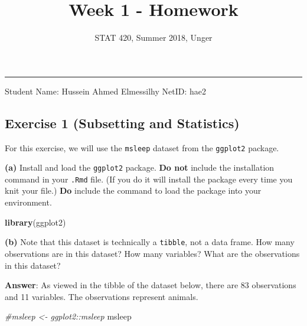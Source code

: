 \documentclass[]{article}
\title{Week 1 - Homework}
\author{STAT 420, Summer 2018, Unger}
\date{}
\newenvironment{Shaded}{\begin{snugshade}}{\end{snugshade}}
\newcommand{\KeywordTok}[1]{\textcolor[rgb]{0.13,0.29,0.53}{\textbf{#1}}}
\newcommand{\CommentTok}[1]{\textcolor[rgb]{0.56,0.35,0.01}{\textit{#1}}}
\newcommand{\NormalTok}[1]{#1}
\begin{document}
\maketitle

\begin{center}\rule{0.5\linewidth}{\linethickness}\end{center}

Student Name: Hussein Ahmed Elmessilhy NetID: hae2

\subsection{Exercise 1 (Subsetting and
Statistics)}\label{exercise-1-subsetting-and-statistics}

For this exercise, we will use the \texttt{msleep} dataset from the
\texttt{ggplot2} package.

\textbf{(a)} Install and load the \texttt{ggplot2} package. \textbf{Do
not} include the installation command in your \texttt{.Rmd} file. (If
you do it will install the package every time you knit your file.)
\textbf{Do} include the command to load the package into your
environment.

\begin{Shaded}
\begin{Highlighting}[]
\KeywordTok{library}\NormalTok{(ggplot2)}
\end{Highlighting}
\end{Shaded}

\textbf{(b)} Note that this dataset is technically a \texttt{tibble},
not a data frame. How many observations are in this dataset? How many
variables? What are the observations in this dataset?

\textbf{Answer}: As viewed in the tibble of the dataset below, there are
83 observations and 11 variables. The observations represent animals.

\begin{Shaded}
\begin{Highlighting}[]
\CommentTok{#msleep <- ggplot2::msleep}
\NormalTok{msleep}
\end{Highlighting}
\end{Shaded}
\end{document}
